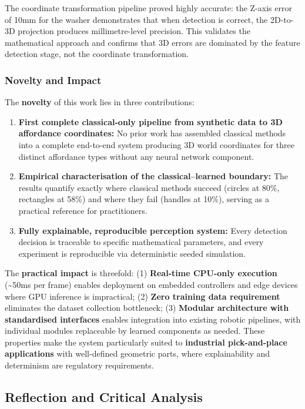 \documentclass[11pt,a4paper]{article}
\begin{document}
The coordinate transformation pipeline proved highly accurate: the Z-axis error of 10mm for the washer demonstrates that when detection is correct, the 2D-to-3D projection produces millimetre-level precision. This validates the mathematical approach and confirms that 3D errors are dominated by the feature detection stage, not the coordinate transformation.

\subsubsection{Novelty and Impact}

The \textbf{novelty} of this work lies in three contributions:

\begin{enumerate}[leftmargin=1.2cm]
  \item \textbf{First complete classical-only pipeline from synthetic data to 3D affordance coordinates:} No prior work has assembled classical methods into a complete end-to-end system producing 3D world coordinates for three distinct affordance types without any neural network component.
  \item \textbf{Empirical characterisation of the classical--learned boundary:} The results quantify exactly where classical methods succeed (circles at 80\%, rectangles at 58\%) and where they fail (handles at 10\%), serving as a practical reference for practitioners.
  \item \textbf{Fully explainable, reproducible perception system:} Every detection decision is traceable to specific mathematical parameters, and every experiment is reproducible via deterministic seeded simulation.
\end{enumerate}

The \textbf{practical impact} is threefold: (1) \textbf{Real-time CPU-only execution} (\textasciitilde50ms per frame) enables deployment on embedded controllers and edge devices where GPU inference is impractical; (2) \textbf{Zero training data requirement} eliminates the dataset collection bottleneck; (3) \textbf{Modular architecture with standardised interfaces} enables integration into existing robotic pipelines, with individual modules replaceable by learned components as needed. These properties make the system particularly suited to \textbf{industrial pick-and-place applications} with well-defined geometric parts, where explainability and determinism are regulatory requirements.

\subsection{Reflection and Critical Analysis}
\end{document}
